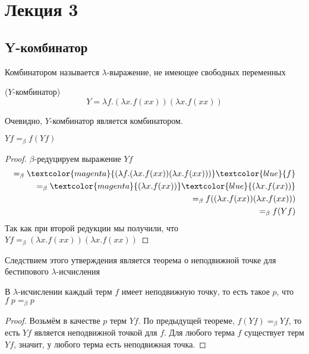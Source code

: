 \section{Лекция 3}

\subsection{Y-комбинатор}

\begin{definition}
	Комбинатором называется $\lambda$-выражение, не имеющее свободных переменных
\end{definition}

\begin{definition}($Y$-комбинатор)
	\[
	Y = \lambda f . (\lambda x . f (x x)) (\lambda x . f (x x))
	\]
\end{definition}

Очевидно, $Y$-комбинатор является комбинатором.

\begin{theorem}
	$Y f =_{\beta} f (Y f)$
	
	\begin{proof}
		$\beta$-редуцируем выражение $Y f$
		\begin{align*}
			 =_{\beta} \textcolor{magenta}{(\lambda f . (\lambda x . f (x x)) (\lambda x . f (x x)))}\textcolor{blue}{f} \\ =_{\beta} \textcolor{magenta}{(\lambda x . f (x x))} \textcolor{blue}{(\lambda x . f (x x))} \\ =_{\beta} f ((\lambda x . f (x x))(\lambda x . f (x x))) \\ =_{\beta} f(Y f)
		\end{align*}
		Так как при второй редукции мы получили, что $Y f =_{\beta} (\lambda x . f (x x))(\lambda x . f (x x))$
	\end{proof}	
\end{theorem}

Следствием этого утверждения является теорема о неподвижной точке для бестипового $\lambda$-исчисления

\begin{theorem}
	В $\lambda$-исчислении каждый терм $f$ имеет неподвижную точку, то есть такое $p$, что $f \; p =_{\beta} p$
	
	\begin{proof}
		Возьмём в качестве $p$ терм $Y f$. По предыдущей теореме, $f(Y f) =_{\beta} Y f$, то есть $Y f$ является неподвижной точкой для $f$. Для любого терма $f$ существует терм $Y f$, значит, у любого терма есть неподвижная точка.
	\end{proof}
\end{theorem}

